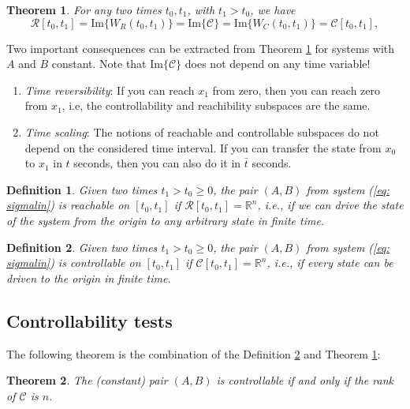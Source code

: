 \documentclass[11pt,a4paper,titlepage]{article}
\newtheorem{definition}{Definition}
\newtheorem{theorem}{Theorem}
\begin{document}
\begin{theorem}
	\label{thm: spcon}
For any two times $t_0, t_1$, with $t_1 > t_0$, we have
	\begin{equation}
		\mathcal{R}[t_0,t_1] = \text{Im}\{W_R(t_0,t_1)\} = \text{Im}\{\mathcal{C}\} = \text{Im}\{W_C(t_0,t_1)\} = \mathcal{C}[t_0,t_1],
	\end{equation}
\end{theorem}

Two important consequences can be extracted from Theorem \ref{thm: spcon} for systems with $A$ and $B$ constant. Note that $\text{Im}\{\mathcal{C}\}$ does not depend on any time variable!
\begin{enumerate}
	\item \emph{Time reversibility}: If you can reach $x_1$ from zero, then you can reach zero from $x_1$, i.e, the controllability and reachibility subspaces are the same.
	\item \emph{Time scaling}: The notions of reachable and controllable subspaces do not depend on the considered time interval. If you can transfer the state from $x_0$ to $x_1$ in $t$ seconds, then you can also do it in $\bar t$ seconds.
\end{enumerate}

\begin{definition}
	Given two times $t_1 > t_0 \geq 0$, the pair $(A,B)$ from system (\ref{eq: sigmalin}) is reachable on $[t_0, t_1]$ if $\mathcal{R}[t_0,t_1] = \mathbb{R}^n$, i.e., if we can drive the state of the system from the origin to any arbitrary state in finite time.
\end{definition}

\begin{definition}
	\label{def: con}
	Given two times $t_1 > t_0 \geq 0$, the pair $(A,B)$ from system (\ref{eq: sigmalin}) is controllable on $[t_0, t_1]$ if $\mathcal{C}[t_0,t_1] = \mathbb{R}^n$, i.e., if every state can be driven to the origin in finite time.
\end{definition}

\subsection{Controllability tests}
The following theorem is the combination of the Definition \ref{def: con} and Theorem \ref{thm: spcon}:
\begin{theorem}
	The (constant) pair $(A,B)$ is controllable if and only if the rank of $\mathcal{C}$ is $n$.
\end{theorem}
\end{document}
